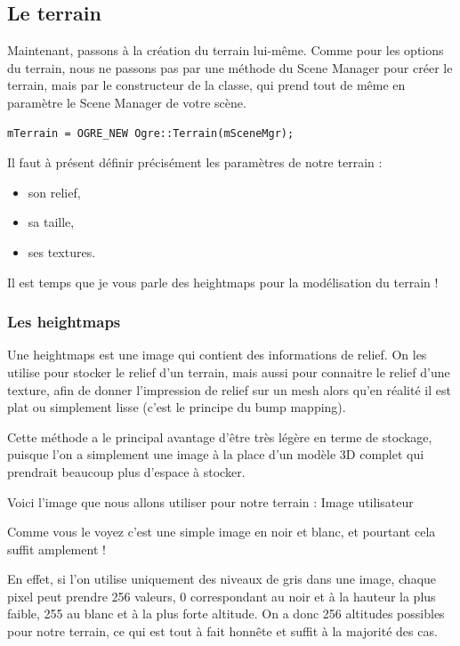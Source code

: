 \documentclass[10pt,a4paper]{report}
\begin{document}
\subsection{Le terrain}


Maintenant, passons \`a la cr\'eation du terrain lui-m\^eme. Comme pour les options du terrain, nous ne passons pas par une m\'ethode du Scene Manager pour cr\'eer le terrain, mais par le constructeur de la classe, qui prend tout de m\^eme en param\`etre le Scene Manager de votre sc\`ene.

\begin{lstlisting}[caption={Cr\'eation du terrain}]
mTerrain = OGRE_NEW Ogre::Terrain(mSceneMgr);
\end{lstlisting}

Il faut \`a pr\'esent d\'efinir pr\'ecis\'ement les param\`etres de notre terrain :

\begin{itemize}
\item son relief, 
\item sa taille,
\item ses textures.
\end{itemize}

Il est temps que je vous parle des heightmaps pour la mod\'elisation du terrain !


\subsubsection{Les heightmaps}

Une heightmaps est une image qui contient des informations de relief. On les utilise pour stocker le relief d'un terrain, mais aussi pour connaitre le relief d'une texture, afin de donner l'impression de relief sur un mesh alors qu'en r\'ealit\'e il est plat ou simplement lisse (c'est le principe du bump mapping).

Cette m\'ethode a le principal avantage d'\^etre tr\`es l\'eg\`ere en terme de stockage, puisque l'on a simplement une image \`a la place d'un mod\`ele 3D complet qui prendrait beaucoup plus d'espace \`a stocker.

Voici l'image que nous allons utiliser pour notre terrain :
Image utilisateur

Comme vous le voyez c'est une simple image en noir et blanc, et pourtant cela suffit amplement !

En effet, si l'on utilise uniquement des niveaux de gris dans une image, chaque pixel peut prendre 256 valeurs, 0 correspondant au noir et \`a la hauteur la plus faible, 255 au blanc et \`a la plus forte altitude. On a donc 256 altitudes possibles pour notre terrain, ce qui est tout \`a fait honn\^ete et suffit \`a la majorit\'e des cas.
\end{document}
